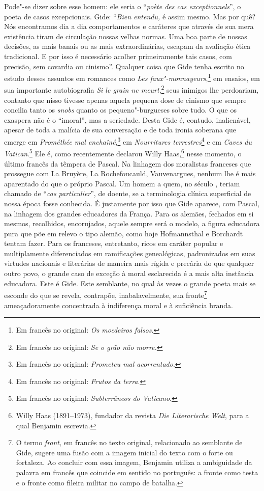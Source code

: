 Pode"-se dizer sobre esse homem: ele seria o ``\emph{poète des cas
exceptionnels}'', o poeta de casos excepcionais. Gide: ``\emph{Bien
entendu,} é assim mesmo. Mas por quê? Nós encontramos dia a dia
comportamentos e caráteres que através de sua mera existência tiram de
circulação nossas velhas normas. Uma boa parte de nossas decisões, as
mais banais ou as mais extraordinárias, escapam da avaliação ética
tradicional. E por isso é necessário acolher primeiramente tais casos,
com precisão, sem covardia ou cinismo''. Qualquer coisa que Gide tenha
escrito no estudo desses assuntos em romances como \emph{Les
faux"-monnayeurs},\footnote{Em francês no original: \emph{Os moedeiros falsos}. \versal{[N.~T.]}}
em ensaios, em sua importante autobiografia \emph{Si le grain ne meurt},\footnote{Em francês no original: \emph{Se o grão não morre.} \versal{[N.~T.]}} seus inimigos lhe
perdoariam, contanto que nisso tivesse apenas aquela pequena dose de
cinismo que sempre concilia tanto os \emph{snobs} quanto os
pequeno"-burgueses sobre tudo. O que os exaspera não é o ``imoral'', mas a
seriedade. Desta Gide é, contudo, inalienável, apesar de toda a malícia
de sua conversação e de toda ironia soberana que emerge em
\emph{Prométhée mal enchaîné},\footnote{Em francês no original: \emph{Prometeu mal
  acorrentado}. \versal{[N.~T.]}} em \emph{Nourritures terrestres}\footnote{Em francês no original: \emph{Frutos da terra}. \versal{[N.~T.]}} e em \emph{Caves du Vatican}.\footnote{Em francês no original: \emph{Subterrâneos do Vaticano}. \versal{[N.~T.]}} Ele é, como recentemente declarou Willy Haas,\footnote{Willy Haas (1891--1973), fundador da revista \emph{Die
  Literarische Welt}, para a qual Benjamin escrevia. \versal{[N.~O.]}} nesse momento, o
último francês da têmpera de Pascal. Na linhagem dos moralistas
franceses que prossegue com La Bruyère, La Rochefoucauld, Vauvenargues,
nenhum lhe é mais aparentado do que o próprio Pascal. Um homem a quem,
no século , teriam chamado de ``\emph{cas particulier}'', de doente,
se a terminologia clínica superficial de nossa época fosse conhecida. É
justamente por isso que Gide aparece, com Pascal, na linhagem dos
grandes educadores da França. Para os alemães, fechados em si mesmos,
recolhidos, encorujados, aquele sempre será o modelo, a figura educadora
pura que põe em relevo o tipo alemão, como hoje Hofmannsthal e Borchardt
tentam fazer. Para os franceses, entretanto, ricos em caráter popular
e multiplamente diferenciados em ramificações genealógicas, padronizados
em suas virtudes nacionais e literárias de maneira mais rígida e
precária do que qualquer outro povo, o grande caso de exceção à moral
esclarecida é a mais alta instância educadora. Este é Gide. Este
semblante, no qual às vezes o grande poeta mais se esconde do que se
revela, contrapõe, inabalavelmente, sua fronte\footnote{O termo
  \emph{front}, em francês no texto original, relacionado ao semblante de
  Gide, sugere uma fusão com a imagem inicial do texto com o forte ou
  fortaleza. Ao concluir com essa imagem, Benjamin utiliza a ambiguidade
  da palavra em francês que coincide em sentido no português: a fronte
  como testa e o fronte como fileira militar no campo de batalha. \versal{[N.~T.]}}
ameaçadoramente concentrada à indiferença moral e à suficiência branda.
